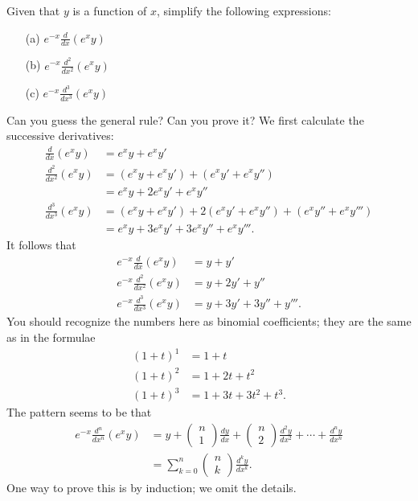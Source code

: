 \documentclass[a4paper]{book}
\newcommand{\bcf}[2]{\left(\begin{array}{c}{#1}\\{#2}\end{array}\right)}
\renewcommand{\:}{\colon}
\theoremstyle{definition}
\newenvironment{starex}{
 \renewcommand{\thetheorem}{\arabic{chapter}.\arabic{section}.\arabic{theorem}${}^*$}
 \exercise
}{\endexercise}
\renewenvironment{solution}{\SolutionInline}{\endSolutionInline}
\begin{document}
\begin{starex}
 Given that $y$ is a function of $x$, simplify the following expressions:
 \begin{itemize}
  \item[(a)] $e^{-x}\frac{d}{dx}(e^x y)$ 
  \item[(b)] $e^{-x}\frac{d^2}{dx^2}(e^x y)$ 
  \item[(c)] $e^{-x}\frac{d^3}{dx^3}(e^x y)$ 
 \end{itemize}
 Can you guess the general rule?  Can you prove it?
\end{starex}
\begin{solution}
 We first calculate the successive derivatives:
 \begin{align*}
  \frac{d}{dx}(e^x y) &=
   e^x y + e^x y' \\ 
  \frac{d^2}{dx^2}(e^x y) &= 
   (e^x y + e^x y') + (e^x y' + e^x y'') \\
   &= e^x y + 2 e^x y' + e^x y'' \\
  \frac{d^3}{dx^3}(e^x y) &= 
   (e^x y + e^x y') + 2(e^x y' + e^x y'') + (e^x y'' + e^x y''') \\
   &= e^x y + 3 e^x y' + 3 e^x y'' + e^x y'''.
 \end{align*}
 It follows that
 \begin{align*}
  e^{-x}\frac{d}{dx}(e^x y)     &= y + y' \\
  e^{-x}\frac{d^2}{dx^2}(e^x y) &= y + 2y' + y'' \\
  e^{-x}\frac{d^3}{dx^3}(e^x y) &= y + 3y' + 3y'' + y'''.
 \end{align*}
 You should recognize the numbers here as binomial coefficients; they
 are the same as in the formulae
 \begin{align*}
  (1+t)^1 &= 1 + t \\
  (1+t)^2 &= 1 + 2t + t^2 \\
  (1+t)^3 &= 1 + 3t + 3t^2 + t^3.
 \end{align*}
 The pattern seems to be that
 \begin{align*}
  e^{-x}\frac{d^n}{dx^n}(e^x y) &= 
   y + \bcf{n}{1} \frac{dy}{dx} + \bcf{n}{2} \frac{d^2y}{dx^2} + 
    \cdots + \frac{d^ny}{dx^n} \\
   &= \sum_{k=0}^n \bcf{n}{k} \frac{d^ky}{dx^k}.
 \end{align*}
 One way to prove this is by induction; we omit the details.  


\end{solution}
\end{document}
